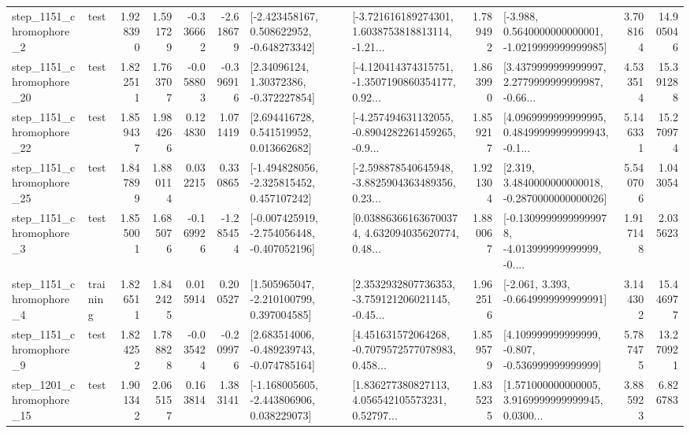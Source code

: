 \begin{tabular}{llrrrrllrlrr}
  step\_1151\_chromophore\_2 &      test &      1.928390 &    1.591729 &     -0.336662 & -2.618679 &   [-2.423458167, 0.508622952, -0.648273342] &  [-3.721616189274301, 1.6038753818813114, -1.21... &       1.789492 &  [-3.988, 0.5640000000000001, -1.0219999999999985] &            3.708164 &         14.905046 \\
 step\_1151\_chromophore\_20 &      test &      1.822511 &    1.763707 &     -0.058803 & -0.396916 &      [2.34096124, 1.30372386, -0.372227854] &  [-4.120414374315751, -1.3507190860354177, 0.92... &       1.863990 &  [3.4379999999999997, 2.2779999999999987, -0.66... &            4.533514 &         15.391288 \\
 step\_1151\_chromophore\_22 &      test &      1.859437 &    1.984266 &      0.124830 &  1.071419 &     [2.694416728, 0.541519952, 0.013662682] &  [-4.257494631132055, -0.8904282261459265, -0.9... &       1.859217 &  [4.0969999999999995, 0.48499999999999943, -0.1... &            5.146331 &         15.270974 \\
 step\_1151\_chromophore\_25 &      test &      1.847899 &    1.880114 &      0.032215 &  0.330865 &   [-1.494828056, -2.325815452, 0.457107242] &  [-2.598878540645948, -3.8825904363489356, 0.23... &       1.921304 &   [2.319, 3.4840000000000018, -0.2870000000000026] &            5.540706 &          1.043054 \\
  step\_1151\_chromophore\_3 &      test &      1.855001 &    1.685076 &     -0.169926 & -1.285454 &  [-0.007425919, -2.754056448, -0.407052196] &  [0.038863661636700374, 4.632094035620774, 0.48... &       1.880067 &  [-0.13099999999999978, -4.013999999999999, -0.... &            1.917148 &          2.035623 \\
  step\_1151\_chromophore\_4 &  training &      1.826511 &    1.842425 &      0.015914 &  0.200527 &    [1.505965047, -2.210100799, 0.397004585] &  [2.3532932807736353, -3.759121206021145, -0.45... &       1.962516 &               [-2.061, 3.393, -0.6649999999999991] &            3.144302 &         15.446977 \\
  step\_1151\_chromophore\_9 &      test &      1.824252 &    1.788828 &     -0.035424 & -0.209976 &   [2.683514006, -0.489239743, -0.074785164] &  [4.451631572064268, -0.7079572577078983, 0.458... &       1.859579 &    [4.109999999999999, -0.807, -0.536999999999999] &            5.787475 &         13.270921 \\
 step\_1201\_chromophore\_15 &      test &      1.901342 &    2.065157 &      0.163814 &  1.383141 &   [-1.168005605, -2.443806906, 0.038229073] &  [1.836277380827113, 4.056542105573231, 0.52797... &       1.835235 &  [1.571000000000005, 3.9169999999999945, 0.0300... &            3.885923 &          6.826783 \\

\end{tabular}
